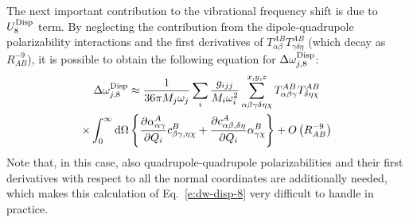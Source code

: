 \documentclass[b5paper,oneside,fleqn,11pt]{book}
\newcommand{\fderiv}[2]{\ensuremath{
    \frac{\partial #1}{\partial #2}}}
\begin{document}
\begin{refsection}
The next important contribution to the vibrational frequency 
shift is due to $U_{8}^{\rm Disp}$ term. By neglecting the 
contribution from the dipole\hyp{}quadrupole polarizability 
interactions and the first derivatives of $T^{AB}_{\alpha\beta}T^{AB}_{\gamma\delta\eta}$ 
(which decay as $R^{-9}_{AB}$), it is possible to obtain 
the following equation for $\Delta \omega_{j,8}^{\rm Disp}$: 
%
\begin{multline} \label{e:dw-disp-8}
 \Delta\omega_{j,8}^{\rm Disp} \approx 
\frac{1}{36\pi M_j\omega_j}\sum_i \frac{g_{ijj}}{M_i\omega_i^2} 
\sum_{\alpha\beta\gamma\delta\eta\chi}^{x,y,z}   
T^{AB}_{\alpha\beta\gamma}T^{AB}_{\delta\eta\chi} \\ \times
%
\int_{0}^{\infty} {\rm d}\Omega
 \left\{
\frac{\partial \alpha_{\alpha\gamma}^{A}}{\partial Q_i} c^{B}_{\beta\gamma,\eta\chi}
+
\fderiv{c^{A}_{\alpha\beta,\delta\eta}}{Q_i} \alpha^B_{\gamma\chi}
\right\}  
+ O\left( R^{-9}_{AB}\right)
\end{multline}
%
Note that, in this case, also quadrupole\hyp{}quadrupole 
polarizabilities and their first derivatives with respect 
to all the normal coordinates are additionally needed, 
which makes this calculation of Eq.~\eqref{e:dw-disp-8} 
very difficult to handle in practice. 


\end{refsection}
\end{document}
